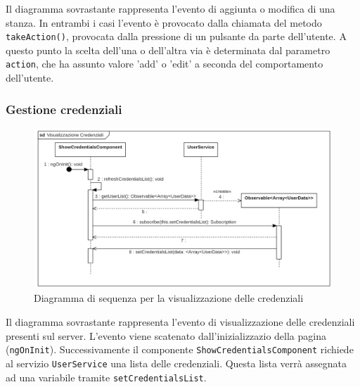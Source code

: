 Il diagramma sovrastante rappresenta l'evento di aggiunta o modifica di una stanza.
In entrambi i casi l'evento è provocato dalla chiamata del metodo \texttt{takeAction()}, provocata dalla pressione di un pulsante da parte dell'utente. A questo punto la scelta dell'una o dell'altra via è determinata dal parametro \texttt{action}, che ha assunto valore 'add' o 'edit' a seconda del comportamento dell'utente.
\subsubsection{Gestione credenziali}
\begin{figure}[H]
	\centering
	\includegraphics[width=18cm]{res/images/webapp-showCredentials-diagrammaSequenza.png}
	\caption{Diagramma di sequenza per la visualizzazione delle credenziali}
	\label{fig:DiagrammaSequenzaVisualizzazioneCredenziali}
\end{figure}
Il diagramma sovrastante rappresenta l'evento di visualizzazione delle credenziali presenti sul server. L'evento viene scatenato dall'inizializzazio della pagina (\texttt{ngOnInit}). Successivamente il componente \texttt{ShowCredentialsComponent} richiede al servizio \texttt{UserService} una lista delle credenziali. Questa lista verrà assegnata ad una variabile tramite \texttt{setCredentialsList}.
